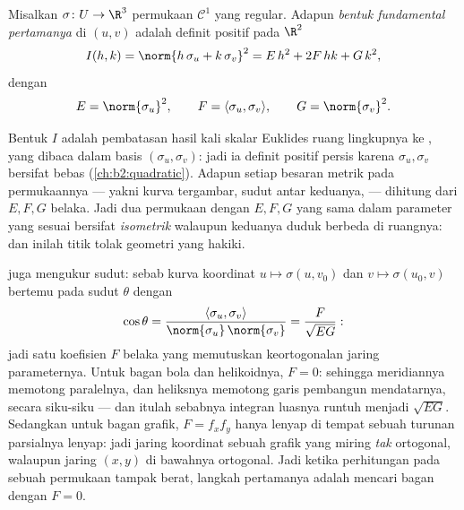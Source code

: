 \begin{definition}\label{def:b2:surfaces:fff}
Misalkan $\sigma \colon U \to \R^3$ permukaan $\mathcal{C}^1$ yang
regular. Adapun \emph{bentuk fundamental pertamanya} di $(u,v)$ adalah
 definit positif pada $\R^2$
\[
I(h, k) = \norm{h\,\sigma_u + k\,\sigma_v}^2
= E\,h^2 + 2F\,hk + G\,k^2,
\]
dengan
\[
E = \norm{\sigma_u}^2,
\qquad
F = \langle \sigma_u, \sigma_v\rangle,
\qquad
G = \norm{\sigma_v}^2 .
\]
\end{definition}

\begin{remark}
Bentuk $I$ adalah pembatasan hasil kali skalar Euklides ruang lingkupnya ke
, yang dibaca dalam basis $(\sigma_u, \sigma_v)$: jadi ia
definit positif persis karena $\sigma_u, \sigma_v$ bersifat
bebas (\cref{ch:b2:quadratic}). Adapun setiap besaran metrik pada
permukaannya --- yakni  kurva tergambar, sudut antar keduanya,  ---
dihitung dari $E, F, G$ belaka. Jadi dua permukaan dengan $E,
F, G$ yang sama dalam parameter yang sesuai bersifat \emph{isometrik} walaupun keduanya duduk
berbeda di ruangnya: dan inilah titik tolak geometri
yang hakiki.
\end{remark}

\begin{example}\label{ex:b2:surfaces:coordangle}
 juga mengukur sudut: sebab
kurva koordinat $u \mapsto \sigma(u, v_0)$ dan $v \mapsto
\sigma(u_0, v)$ bertemu pada sudut $\theta$ dengan
\[
\cos\theta = \frac{\langle\sigma_u,
\sigma_v\rangle}{\norm{\sigma_u}\,\norm{\sigma_v}}
= \frac{F}{\sqrt{EG}} :
\]
jadi satu koefisien $F$ belaka yang memutuskan keortogonalan
jaring parameternya. Untuk bagan bola dan helikoidnya, $F =
0$: sehingga meridiannya memotong paralelnya, dan heliksnya memotong garis
pembangun mendatarnya, secara siku-siku --- dan itulah sebabnya integran
luasnya runtuh menjadi $\sqrt{EG}$. Sedangkan untuk bagan grafik,
$F = f_xf_y$ hanya lenyap di tempat sebuah turunan parsialnya lenyap:
jadi jaring koordinat sebuah grafik yang miring \emph{tak}
ortogonal, walaupun jaring $(x, y)$ di bawahnya ortogonal. Jadi ketika
perhitungan pada sebuah permukaan tampak berat, langkah pertamanya adalah
mencari bagan dengan $F = 0$.
\end{example}


